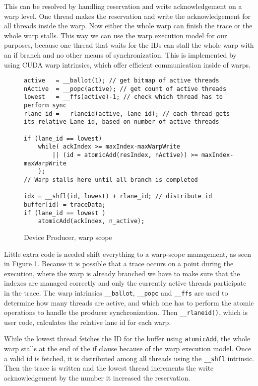 	This can be resolved by handling reservation and write acknowledgement on a warp level. One thread makes the reservation and write the acknowledgement for all threads inside the warp. Now either the whole warp can finish the trace or the whole warp stalls. This way we can use the warp execution model for our purposes, because one thread that waits for the IDs can stall the whole warp with an if branch and no other means of synchronization. This is implemented by using CUDA warp intrinsics, which offer efficient communication inside of warps.
\begin{figure}[t]
	\begin{lstlisting}[style=C]
active   = __ballot(1); // get bitmap of active threads 
nActive  = __popc(active); // get count of active threads
lowest   = __ffs(active)-1; // check which thread has to perform sync
rlane_id = __rlaneid(active, lane_id); // each thread gets its relative Lane id, based on number of active threads
	
if (lane_id == lowest)
	while( ackIndex >= maxIndex-maxWarpWrite 
		|| (id = atomicAdd(resIndex, nActive)) >= maxIndex-maxWarpWrite
	);
// Warp stalls here until all branch is completed

idx = __shfl(id, lowest) + rlane_id; // distribute id
buffer[id] = traceData;
if (lane_id == lowest )
	atomicAdd(ackIndex, n_active);\end{lstlisting}
	\caption{Device Producer, warp scope}
	\label{prod-cons-warp}	
\end{figure}
	Little extra code is needed shift everything to a warp-scope management, as seen in Figure \ref{prod-cons-warp}. Because it is possible that a trace occurs on a point during the execution, where the warp is already branched we have to make sure
	that the indexes are managed correctly and only the currently active threads participate in the trace. The warp intrinsics \verb|__ballot|, \verb|__popc| and \verb|__ffs| are used to determine how many threads are active, and which one has to perform the atomic operations to handle
	the producer synchronization. Then \verb|__rlaneid()|, which is user code, calculates the relative lane id for each warp. 

	While the lowest thread fetches the ID for the buffer using \verb|atomicAdd|, the whole warp stalls at the end of the if clause because of the warp execution model. Once a valid id is fetched, it is distributed among all threads using the \verb|__shfl| intrinsic. 	Then the trace is written and the lowest thread increments the write acknowledgement by the number it increased the reservation.
	
